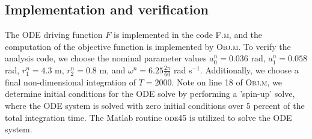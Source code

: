 \documentclass[11pt]{article}
\begin{document}
\subsection{Implementation and verification}

The ODE driving function $F$ is implemented in the
code \textsc{F.m}, and the computation of the objective
function is implemented by \textsc{Obj.m}. To verify
the analysis code, we choose the nominal parameter
values $a^n_0 = 0.036$ rad, $a^n_1 = 0.058$ rad,
$r^n_1 = 4.3$ m, $r^n_2 = 0.8$ m, and
$\omega^n = 6.25 \frac{2 \pi}{60}$ rad s$^{-1}$.
Additionally, we choose
a final non-dimensional integration of $T = 2000$.
Note on line 18 of \textsc{Obj.m}, we determine initial
conditions for the ODE solve by performing a 'spin-up'
solve, where the ODE system is solved with zero initial
conditions over $5$ percent of the total integration time.
The Matlab routine \textsc{ode45} is utilized to solve
the ODE system.
\end{document}
